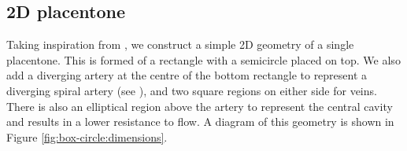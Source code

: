         \subsection{2D placentone} \label{sec:modelling:geometries:2d-placentone}       
            Taking inspiration from \citeauthor{lecarpentierComputationalFluidDynamic2016} \cite{lecarpentierComputationalFluidDynamic2016}, we construct a simple 2D geometry of a single placentone. This is formed of a rectangle with a semicircle placed on top. We also add a diverging artery at the centre of the bottom rectangle to represent a diverging spiral artery (see \cite{burtonRheologicalPhysiologicalConsequences2009}), and two square regions on either side for veins. There is also an elliptical region above the artery to represent the central cavity and results in a lower resistance to flow. A diagram of this geometry is shown in Figure \ref{fig:box-circle:dimensions}.
            
